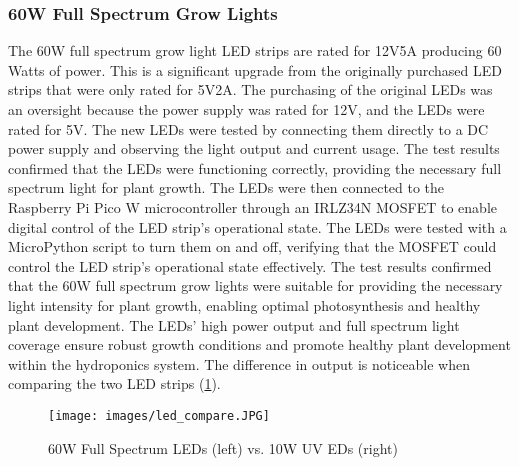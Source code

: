 \documentclass[12pt]{article} %
\begin{document}
\subsubsection{60W Full Spectrum Grow Lights}
\noindent The 60W full spectrum grow light LED strips \cite{ref_growled} are rated for 12V5A producing 60 Watts of power. This is a significant upgrade from the originally purchased LED strips \cite{ref_oldled} that were only rated for 5V2A. The purchasing of the original LEDs was an oversight because the power supply was rated for 12V, and the LEDs were rated for 5V. The new LEDs were tested by connecting them directly to a DC power supply and observing the light output and current usage. The test results confirmed that the LEDs were functioning correctly, providing the necessary full spectrum light for plant growth. The LEDs were then connected to the Raspberry Pi Pico W microcontroller through an IRLZ34N MOSFET to enable digital control of the LED strip's operational state. The LEDs were tested with a MicroPython script to turn them on and off, verifying that the MOSFET could control the LED strip's operational state effectively. The test results confirmed that the 60W full spectrum grow lights were suitable for providing the necessary light intensity for plant growth, enabling optimal photosynthesis and healthy plant development. The LEDs' high power output and full spectrum light coverage ensure robust growth conditions and promote healthy plant development within the hydroponics system. The difference in output is noticeable when comparing the two LED strips (\ref{fig:LED_Compare}).
\begin{figure}[H]
    \centering
    \texttt{[image: images/led\_compare.JPG]}
    \caption{60W Full Spectrum LEDs (left) vs. 10W UV EDs (right)}
    \label{fig:LED_Compare}
\end{figure}
\end{document}

